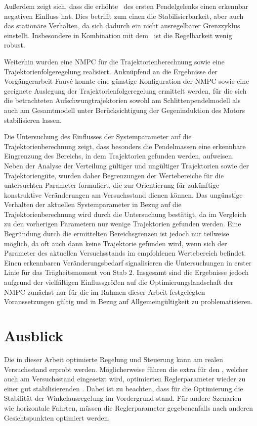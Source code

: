 Außerdem zeigt sich, dass die erhöhte \crb\ des ersten Pendelgelenks einen erkennbar negativen Einfluss hat.
Dies betrifft zum einen die Stabilisierbarkeit, aber auch das stationäre Verhalten, da sich dadurch ein nicht ausregelbarer Grenzzyklus einstellt.
Insbesondere in Kombination mit dem \beob\ ist die Regelbarkeit wenig robust.

Weiterhin wurden eine NMPC für die Trajektorienberechnung sowie eine Trajektorienfolgeregelung realisiert. Anknüpfend an die Ergebnisse der Vorgängerarbeit Fauvé \cite{fauve} konnte eine günstige Konfiguration der NMPC sowie eine geeignete Auslegung der Trajektorienfolgeregelung ermittelt werden, für die sich die betrachteten Aufschwungtrajektorien sowohl am Schlittenpendelmodell als auch am Gesamtmodell unter Berücksichtigung der Gegeninduktion des Motors stabilisieren lassen.

Die Untersuchung des Einflusses der Systemparameter auf die Trajektorienberechnung zeigt, dass besonders die Pendelmassen eine erkennbare Eingrenzung des Bereichs, in dem Trajektorien gefunden werden, aufweisen. Neben der Analyse der Verteilung gültiger und ungültiger Trajektorien sowie der Trajektoriengüte, wurden daher Begrenzungen der Wertebereiche für die untersuchten Parameter formuliert, die zur Orientierung für zukünftige konstruktive Veränderungen am Versuchsstand dienen können. 
Das ungünstige Verhalten der aktuellen Systemparameter in Bezug auf die Trajektorienberechnung wird durch die Untersuchung bestätigt, da im Vergleich zu den vorherigen Parametern nur wenige Trajektorien gefunden werden.
Eine Begründung durch die ermittelten Bereichsgrenzen ist jedoch nur teilweise möglich, da oft auch dann keine Trajektorie gefunden wird, wenn sich der Parameter des aktuellen Versuchsstands im empfohlenen Wertebereich befindet. Einen erkennbaren Veränderungsbedarf signalisieren die Untersuchungen in erster Linie für das Trägheitsmoment von Stab 2. 
Insgesamt sind die Ergebnisse jedoch aufgrund der vielfältigen Einflussgrößen auf die Optimierungslandschaft der NMPC zunächst nur für die im Rahmen dieser Arbeit festgelegten Voraussetzungen gültig und in Bezug auf Allgemeingültigkeit zu problematisieren. 

  

\section{Ausblick}

Die in dieser Arbeit optimierte Regelung und Steuerung kann am realen Versuchsstand erprobt werden.
Möglicherweise führen die extra für den \beob, welcher auch am Versuchsstand eingesetzt wird, optimierten Reglerparameter wieder zu einer gut stabilisierenden \aprg.
Dabei ist zu beachten, dass für die Optimierung die Stabilität der Winkelausregelung im Vordergrund stand.
Für andere Szenarien wie horizontale Fahrten, müssen die Reglerparameter gegebenenfalls nach anderen Gesichtspunkten optimiert werden.

